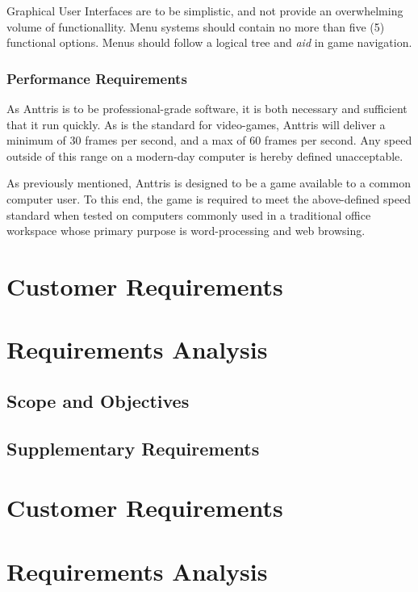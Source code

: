 \documentclass[12pt]{article}
\begin{document}
Graphical User Interfaces are to be simplistic, and not provide an overwhelming 
volume of functionallity. Menu systems should contain no more than five (5) 
functional options. Menus should follow a logical tree and \textsl{aid} in 
game navigation.
\subsubsection{Performance Requirements}
As Anttris is to be professional-grade software, it is both necessary and 
sufficient that it run quickly. As is the standard for video-games, Anttris 
will deliver a minimum of 30 frames per second, and a max of 60 frames per 
second. Any speed outside of this range on a modern-day computer is hereby 
defined unacceptable.

As previously mentioned, Anttris is designed to be a game available to a common 
computer user. To this end, the game is required to meet the above-defined 
speed standard when tested on computers commonly used in a traditional office 
workspace whose primary purpose is word-processing and web browsing.
\section{Customer Requirements}
\section{Requirements Analysis}

\subsection{Scope and Objectives}

\subsection{Supplementary Requirements}

\section{Customer Requirements}

\section{Requirements Analysis}
\end{document}

